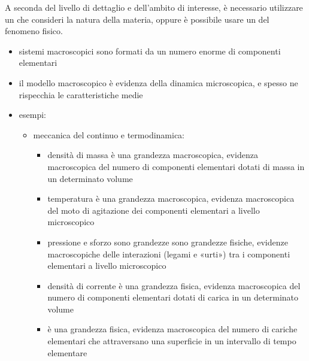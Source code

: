 \documentclass[letterpaper,10pt,italian]{jupyterBook}
\begin{document}
\sphinxAtStartPar
A seconda del livello di dettaglio e dell’ambito di interesse, è necessario utilizzare un  che consideri la natura  della materia, oppure è possibile usare un   del fenomeno fisico.
\begin{itemize}
\item {} 
\sphinxAtStartPar
sistemi macroscopici sono formati da un numero enorme di componenti elementari

\item {} 
\sphinxAtStartPar
il modello macroscopico è evidenza della dinamica microscopica, e spesso ne rispecchia le caratteristiche medie

\item {} 
\sphinxAtStartPar
esempi:
\begin{itemize}
\item {} 
\sphinxAtStartPar
meccanica del continuo e termodinamica:
\begin{itemize}
\item {} 
\sphinxAtStartPar
densità di massa è una grandezza macroscopica, evidenza macroscopica del numero di componenti elementari dotati di massa in un determinato volume

\item {} 
\sphinxAtStartPar
temperatura è una grandezza macroscopica, evidenza macroscopica del moto di agitazione dei componenti elementari a livello microscopico

\item {} 
\sphinxAtStartPar
pressione e sforzo sono grandezze sono grandezze fisiche, evidenze macroscopiche delle interazioni (legami e «urti») tra i componenti elementari a livello microscopico

\item {} 
\sphinxAtStartPar
densità di corrente è una grandezza fisica, evidenza macroscopica del numero di componenti elementari dotati di carica in un determinato volume

\item {} 
\sphinxAtStartPar
{\hyperref[\detokenize{ch/electromagnetism/electric-current:physics-hs-electromagnetism-electric-current}]{}} è una grandezza fisica, evidenza macroscopica del numero di cariche elementari che attraversano una superficie in un intervallo di tempo elementare

\end{itemize}

\end{itemize}

\end{itemize}
\end{document}
